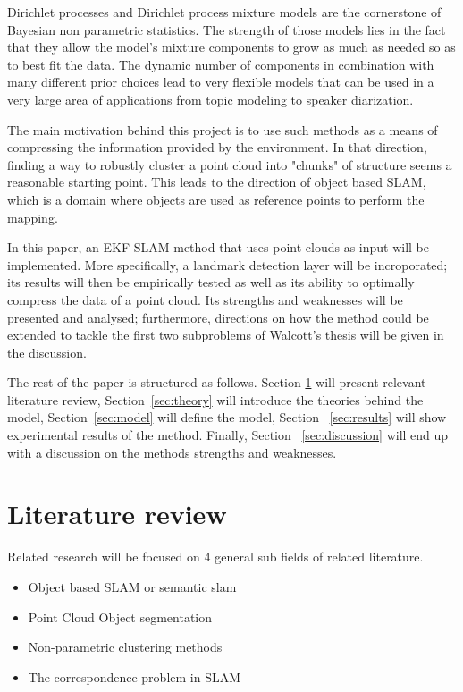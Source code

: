 \documentclass[twoside,hidelinks]{article}
\begin{document}
Dirichlet processes and Dirichlet process mixture models \cite{nonParam} are the cornerstone of Bayesian non parametric statistics. The strength of those models lies in the fact that they allow the model's mixture components to grow as much as needed so as to best fit the data. The dynamic number of components in combination with many different prior choices lead to very flexible models that can be used in a very large area of applications from topic modeling\cite{LDA} to speaker diarization\cite{speakerDiar}. 

The main motivation behind this project is to use such methods as a means of compressing the information provided by the environment. In that direction, finding a way to robustly cluster a point cloud into "chunks" of structure seems a reasonable starting point. This leads to the direction of object based SLAM, which is a domain where objects are used as reference points to perform the mapping.

In this paper, an EKF SLAM method that uses point clouds as input will be implemented. More specifically, a landmark detection layer will be incroporated; its results will then be empirically tested as well as its ability to optimally compress the data of a point cloud. Its strengths and weaknesses will be presented and analysed; furthermore, directions on how the method could be extended to tackle the first two subproblems of Walcott's thesis will be given in the discussion.

The rest of the paper is structured as follows. Section \ref{sec:literature} will present relevant literature review, Section~\ref{sec:theory} will introduce the theories behind the model, Section~\ref{sec:model} will define the model, Section ~\ref{sec:results} will show experimental results of the method. Finally, Section ~\ref{sec:discussion} will end up with a discussion on the methods strengths and weaknesses.

 
\section{Literature review}
\label{sec:literature}

Related research will be focused on 4 general sub fields of related literature.
\begin{itemize}
	\item Object based SLAM or semantic slam
	\item Point Cloud Object segmentation
	\item Non-parametric clustering methods
	\item The correspondence problem in SLAM
\end{itemize}
\end{document}
